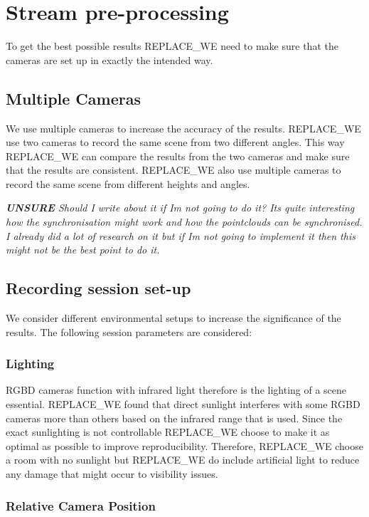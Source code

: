 \section{Stream pre-processing}
\label{sec:stream_pre_processing}

To get the best possible results REPLACE_WE need to make sure that the cameras are set up in exactly the intended way. 

\subsection{Multiple Cameras}

We use multiple cameras to increase the accuracy of the results. REPLACE_WE use two cameras to record the same scene from two different angles. This way REPLACE_WE can compare the results from the two cameras and make sure that the results are consistent. REPLACE_WE also use multiple cameras to record the same scene from different heights and angles.

\textit{\textbf{UNSURE} Should I write about it if Im not going to do it? Its quite interesting how the synchronisation might work and how the pointclouds can be synchronised. I already did a lot of research on it but if Im not going to implement it then this might not be the best point to do it.}

\subsection{Recording session set-up}

We consider different environmental setups to increase the significance of the results. The following session parameters are considered:

\subsubsection{Lighting}

RGBD cameras function with infrared light therefore is the lighting of a scene essential. REPLACE_WE found that direct sunlight interferes with some RGBD cameras more than others based on the infrared range that is used. Since the exact sunlighting is not controllable REPLACE_WE choose to make it as optimal as possible to improve reproducibility. Therefore, REPLACE_WE choose a room with no sunlight but REPLACE_WE do include artificial light to reduce any damage that might occur to visibility issues.

\subsubsection{Relative Camera Position}

